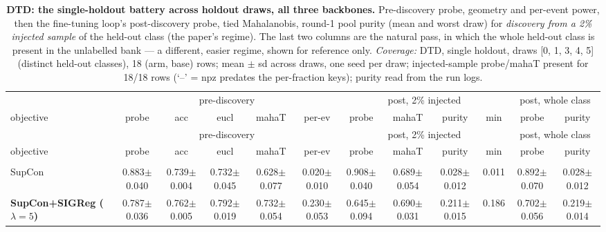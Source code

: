 \begin{landscape}
\begin{center}
\footnotesize
\setlength{\tabcolsep}{3pt}
\begin{longtable}{lccccccccccc}
\caption{\textbf{DTD: the single-holdout battery across holdout draws, all three backbones.} Pre-discovery probe, geometry and per-event power, then the fine-tuning loop's post-discovery probe, tied Mahalanobis, round-1 pool purity (mean and worst draw) for \emph{discovery from a 2\% injected sample} of the held-out class (the paper's regime). The last two columns are the natural pass, in which the whole held-out class is present in the unlabelled bank --- a different, easier regime, shown for reference only. \emph{Coverage:} DTD, single holdout, draws [0, 1, 3, 4, 5] (distinct held-out classes), 18 (arm, base) rows; mean $\pm$ sd across draws, one seed per draw; injected-sample probe/mahaT present for 18/18 rows (`--' = npz predates the per-fraction keys); purity read from the run logs.}\label{tab:app_dtd_draws}\\
\toprule
& \multicolumn{5}{c}{pre-discovery} & \multicolumn{4}{c}{post, 2\% injected} & \multicolumn{2}{c}{post, whole class} \\
\cmidrule(lr){2-6}\cmidrule(lr){7-10}\cmidrule(lr){11-12}
objective & probe & acc & eucl & mahaT & per-ev & probe & mahaT & purity & min & probe & purity \\
\midrule
\endfirsthead
\toprule
& \multicolumn{5}{c}{pre-discovery} & \multicolumn{4}{c}{post, 2\% injected} & \multicolumn{2}{c}{post, whole class} \\
\cmidrule(lr){2-6}\cmidrule(lr){7-10}\cmidrule(lr){11-12}
objective & probe & acc & eucl & mahaT & per-ev & probe & mahaT & purity & min & probe & purity \\
\midrule
\endhead
\bottomrule
\endfoot
\multicolumn{12}{l}{\emph{DTD / DINO, 5 draws}} \\
\quad SupCon & 0.883$\pm$0.040 & 0.739$\pm$0.004 & 0.732$\pm$0.045 & 0.628$\pm$0.077 & 0.020$\pm$0.010 & 0.908$\pm$0.040 & 0.689$\pm$0.054 & 0.028$\pm$0.012 & 0.011 & 0.892$\pm$0.070 & 0.028$\pm$0.012 \\
\quad \textbf{SupCon+SIGReg ($\lambda{=}5$)} & 0.787$\pm$0.036 & 0.762$\pm$0.005 & 0.792$\pm$0.019 & 0.732$\pm$0.054 & 0.230$\pm$0.053 & 0.645$\pm$0.094 & 0.690$\pm$0.031 & 0.211$\pm$0.015 & 0.186 & 0.702$\pm$0.056 & 0.219$\pm$0.014 \\

\end{longtable}
\end{center}
\end{landscape}
